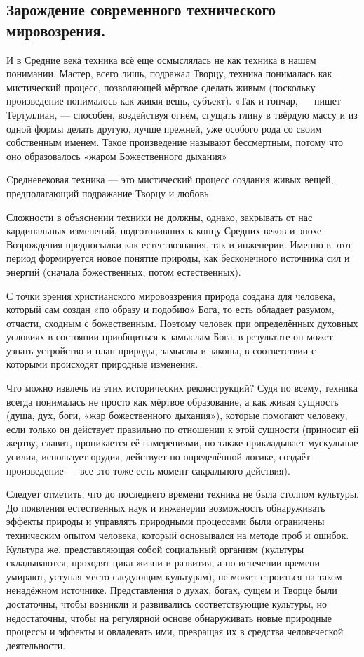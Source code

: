 \documentclass[a4paper]{article}
\begin{document}
{\subsection{Зарождение современного технического мировозрения.}
И в Средние века техника всё еще осмыслялась не как техника в нашем понимании. Мастер, всего лишь, подражал Творцу, техника понималась как мистический процесс, позволяющей мёртвое сделать живым (поскольку произведение понималось как живая вещь, субъект). «Так и гончар, — пишет Тертуллиан, — способен, воздействуя огнём, сгущать глину в твёрдую массу и из одной формы делать другую, лучше прежней, уже особого рода со своим собственным именем. Такое произведение называют бессмертным, потому что оно образовалось «жаром Божественного дыхания»

Cредневековая техника — это мистический процесс создания живых вещей, предполагающий подражание Творцу и любовь.

Сложности в объяснении техники не должны, однако, закрывать от нас кардинальных изменений, подготовивших к концу Средних веков и эпохе Возрождения предпосылки как естествознания, так и инженерии. Именно в этот период формируется новое понятие природы, как бесконечного источника сил и энергий (сначала божественных, потом естественных). 

С точки зрения христианского мировоззрения природа создана для человека, который сам создан «по образу и подобию» Бога, то есть обладает разумом, отчасти, сходным с божественным. Поэтому человек при определённых духовных условиях в состоянии приобщиться к замыслам Бога, в результате он может узнать устройство и план природы, замыслы и законы, в соответствии с которыми происходят природные изменения.

Что можно извлечь из этих исторических реконструкций? Судя по всему, техника всегда понималась не просто как мёртвое образование, а как живая сущность (душа, дух, боги, «жар божественного дыхания»), которые помогают человеку, если только он действует правильно по отношении к этой сущности (приносит ей жертву, славит, проникается её намерениями, но также прикладывает мускульные усилия, использует орудия, действует по определённой логике, создаёт произведение — все это тоже есть момент сакрального действия). 

Следует отметить, что до последнего времени техника не была столпом культуры. До появления естественных наук и инженерии возможность обнаруживать эффекты природы и управлять природными процессами были ограничены техническим опытом человека, который основывался на методе проб и ошибок. Культура же, представляющая собой социальный организм (культуры складываются, проходят цикл жизни и развития, а по истечении времени умирают, уступая место следующим культурам), не может строиться на таком ненадёжном источнике. Представления о духах, богах, сущем и Творце были достаточны, чтобы возникли и развивались соответствующие культуры, но недостаточны, чтобы на регулярной основе обнаруживать новые природные процессы и эффекты и овладевать ими, превращая их в средства человеческой деятельности.

}
\end{document}
